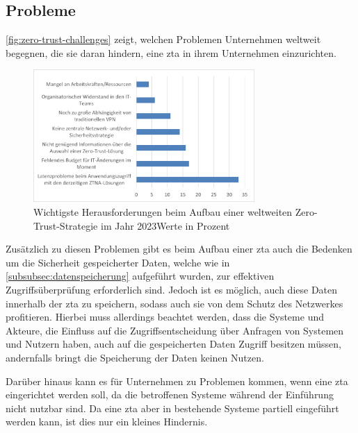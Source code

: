 \subsection{Probleme}\label{subsec:probleme}
\autoref{fig:zero-trust-challenges} zeigt, welchen Problemen Unternehmen weltweit begegnen, die sie daran hindern, eine \ac{zta} in ihrem Unternehmen einzurichten.\autocite[\vglf][]{fortinet-2023}
\begin{figure}[htbp]
    \centering
    \includegraphics[width=0.75\textwidth, trim = {0.2cm 0.3cm 0.4cm 0.25cm}, clip]{src/abbildungen/Herausforderungen_ZeroTrust}
    \captionsetup{width=\linewidth, format=hang}
    \caption[Wichtigste Herausforderungen beim Aufbau einer weltweiten Zero-Trust-Strategie im Jahr 2023]{Wichtigste Herausforderungen beim Aufbau einer weltweiten Zero-Trust-Strategie im Jahr 2023\newline Werte in Prozent}
    \label{fig:zero-trust-challenges}
\end{figure}

Zusätzlich zu diesen Problemen gibt es beim Aufbau einer \ac{zta} auch die Bedenken um die Sicherheit gespeicherter Daten, welche wie in \autoref{subsubsec:datenspeicherung} aufgeführt wurden, zur effektiven Zugriffsüberprüfung erforderlich sind.
Jedoch ist es möglich, auch diese Daten innerhalb der \ac{zta} zu speichern, sodass auch sie von dem Schutz des Netzwerkes profitieren.
Hierbei muss allerdings beachtet werden, dass die Systeme und Akteure, die Einfluss auf die Zugriffsentscheidung über Anfragen von Systemen und Nutzern haben, auch auf die gespeicherten Daten Zugriff besitzen müssen, andernfalls bringt die Speicherung der Daten keinen Nutzen.

Darüber hinaus kann es für Unternehmen zu Problemen kommen, wenn eine \ac{zta} eingerichtet werden soll, da die betroffenen Systeme während der Einführung nicht nutzbar sind.
Da eine \ac{zta} aber in bestehende Systeme partiell eingeführt werden kann, ist dies nur ein kleines Hindernis.


